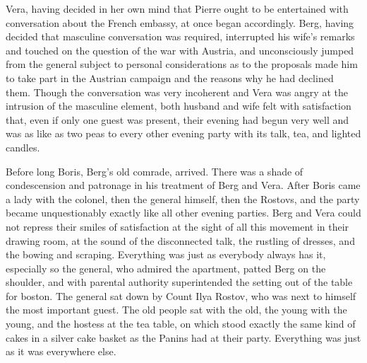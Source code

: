 Vera, having decided in her own mind that Pierre ought to be
entertained with conversation about the French embassy, at once
began accordingly.  Berg, having decided that masculine
conversation was required, interrupted his wife's remarks and
touched on the question of the war with Austria, and
unconsciously jumped from the general subject to personal
considerations as to the proposals made him to take part in the
Austrian campaign and the reasons why he had declined
them. Though the conversation was very incoherent and Vera was
angry at the intrusion of the masculine element, both husband and
wife felt with satisfaction that, even if only one guest was
present, their evening had begun very well and was as like as two
peas to every other evening party with its talk, tea, and lighted
candles.

Before long Boris, Berg's old comrade, arrived. There was a shade
of condescension and patronage in his treatment of Berg and
Vera. After Boris came a lady with the colonel, then the general
himself, then the Rostovs, and the party became unquestionably
exactly like all other evening parties. Berg and Vera could not
repress their smiles of satisfaction at the sight of all this
movement in their drawing room, at the sound of the disconnected
talk, the rustling of dresses, and the bowing and
scraping. Everything was just as everybody always has it,
especially so the general, who admired the apartment, patted Berg
on the shoulder, and with parental authority superintended the
setting out of the table for boston. The general sat down by
Count Ilya Rostov, who was next to himself the most important
guest. The old people sat with the old, the young with the young,
and the hostess at the tea table, on which stood exactly the same
kind of cakes in a silver cake basket as the Panins had at their
party. Everything was just as it was everywhere else.


